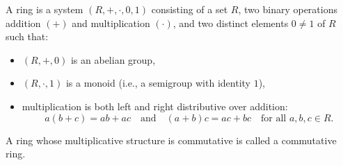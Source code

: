 A ring is a system $(R, +, \cdot, 0, 1)$ consisting of a set $R$, two binary operations addition $(+)$ and multiplication $(\cdot)$, and two distinct elements $0 \neq 1$ of $R$ such that:
\begin{itemize}
\item $(R, +, 0)$ is an abelian group,
\item $(R, \cdot, 1)$ is a monoid (i.e., a semigroup with identity $1$),
\item multiplication is both left and right distributive over addition:
$$a(b + c) = ab + ac \quad \text{and} \quad (a + b)c = ac + bc \quad \text{for all } a, b, c \in R.$$
\end{itemize}
A ring whose multiplicative structure is commutative is called a commutative ring.
